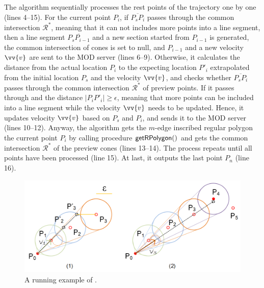 The algorithm sequentially processes the rest points of the trajectory one by one (lines 4--15). 
For the current point $P_{i}$, if $\overline{P_sP_{i}}$ passes through the common intersection $\mathcal{R}^*$, meaning that it can not includes more points into a line segment, then a line segment $\overline{P_sP_{i-1}}$ and a new section started from  $P_{i-1}$ is generated, the common intersection of cones is set to null, and $P_{i-1}$ and a new velocity $\vv{v}$ are sent to the MOD server (lines 6--9).
%
Otherwise, it calculates the distance from the actual location $P_{i}$ to the expecting location $P'_{i}$ extrapolated from the initial location $P_s$ and the velocity $\vv{v}$, and checks whether $\overline{P_sP_{i}}$ passes through the common intersection $\mathcal{R}^*$ of preview points.
If it passes through and the distance $|P_{i}P'_{i}| \ge \epsilon$, meaning that more points can be included into a line segment while the velocity $\vv{v}$ needs to be updated. Hence, it updates velocity $\vv{v}$ based on $P_s$ and $P_{i}$, and sends it to the MOD server (lines 10--12). 
%
Anyway, the algorithm gets the $m$-edge inscribed regular polygon \wrt the current point $P_{i}$ by calling procedure ${\mathsf{getRPolygon()}}$ \cite{Lin:Cised} and gets the common intersection $\mathcal{R}^*$ of the preview cones (lines 13--14). The process repeats until all points have been processed (line 15).
At last, it outputs the last point $P_{n}$ (line 16).
%





\begin{figure}[tb!]
	\centering
	\includegraphics[scale=1.0]{figures/Fig-CITT.png}
	\vspace{-2ex}
	\caption{\small A running example of \citt. }
	\vspace{-3ex}
	\label{fig:citt}
\end{figure}


